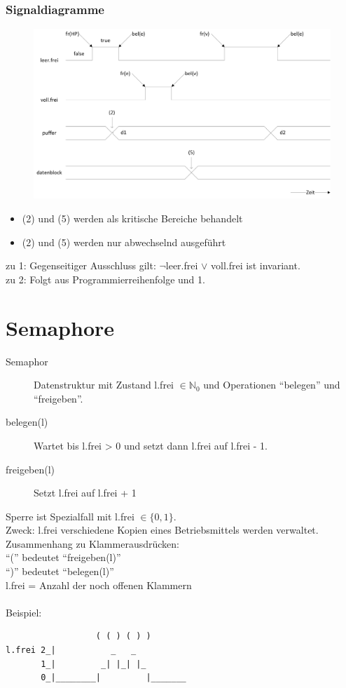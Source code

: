 \subsubsection*{Signaldiagramme}
\begin{figure}[H]
	\begin{center}
		\includegraphics[width=\textwidth]{res/SignalDiagramme}
		\label{pic:synsignal}
	\end{center}
\end{figure} 
\begin{itemize}
	\item (2) und (5) werden als kritische Bereiche behandelt
	\item (2) und (5) werden nur abwechselnd ausgeführt
\end{itemize}
zu 1: Gegenseitiger Ausschluss gilt: $\neg$leer.frei $\lor$ voll.frei ist invariant.\\
zu 2: Folgt aus Programmierreihenfolge und 1.

\section{Semaphore}
\begin{description}
	\item[Semaphor] Datenstruktur mit Zustand l.frei $\in \mathbb{N}_0$ und Operationen "`belegen"' und "`freigeben"'.
	\item[belegen(l)] Wartet bis l.frei > 0 und setzt dann l.frei auf l.frei - 1.
	\item[freigeben(l)] Setzt l.frei auf l.frei + 1
\end{description}
Sperre ist Spezialfall mit l.frei $\in \{0, 1\}$.\\
Zweck: l.frei verschiedene Kopien eines Betriebsmittels werden verwaltet.\\
Zusammenhang zu Klammerausdrücken:\\
"`("' bedeutet "`freigeben(l)"'\\
"`)"' bedeutet "`belegen(l)"'\\
l.frei = Anzahl der noch offenen Klammern\\
\\
Beispiel:
\begin{lstlisting}
                  ( ( ) ( ) )
l.frei 2_|           _   _
       1_|         _| |_| |_
       0_|________|         |_______

\end{lstlisting}
